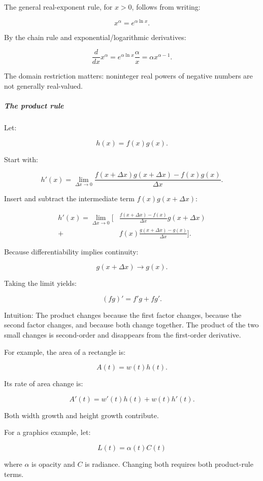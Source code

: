 The general real-exponent rule, for \(x>0\), follows from writing:

\[
x^\alpha=e^{\alpha\ln x}.
\]

By the chain rule and exponential/logarithmic derivatives:

\[
\frac d{dx}x^\alpha =e^{\alpha\ln x}\frac{\alpha}{x} =\alpha x^{\alpha-1}.
\]

The domain restriction matters: noninteger real powers of negative numbers are not generally real-valued.

\subparagraph{The product rule}\label{01-foundations-i-ch020-the-product-rule}

Let:

\[
h(x)=f(x)g(x).
\]

Start with:

\[
h'(x)= \lim_{\Delta x\to0} \frac{f(x+\Delta x)g(x+\Delta x)-f(x)g(x)}{\Delta x}.
\]

Insert and subtract the intermediate term \(f(x)g(x+\Delta x)\):

\[
\begin{aligned} h'(x)=\lim_{\Delta x\to0} \bigg[ &\frac{f(x+\Delta x)-f(x)}{\Delta x}g(x+\Delta x)\\ +{}&f(x)\frac{g(x+\Delta x)-g(x)}{\Delta x} \bigg]. \end{aligned}
\]

Because differentiability implies continuity:

\[
g(x+\Delta x)\to g(x).
\]

Taking the limit yields:

\[
\boxed{(fg)'=f'g+fg'}.
\]

Intuition: The product changes because the first factor changes, because the second factor changes, and because both change together. The product of the two small changes is second-order and disappears from the first-order derivative.

For example, the area of a rectangle is:

\[
A(t)=w(t)h(t).
\]

Its rate of area change is:

\[
A'(t)=w'(t)h(t)+w(t)h'(t).
\]

Both width growth and height growth contribute.

For a graphics example, let:

\[
L(t)=\alpha(t)C(t)
\]

where \(\alpha\) is opacity and \(C\) is radiance. Changing both requires both product-rule terms.

